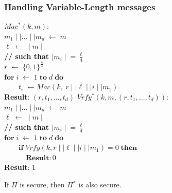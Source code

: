 \documentclass[../main]{subfiles}
\begin{document}
\subsubsection{Handling Variable-Length messages}
$Mac^{*}(k, m)$:\\
$m_1 \mid\mid{} \ldots{} \mid\mid{} m_d \; \leftarrow{} \; m$\\
$\ell{} \; \leftarrow{} \; \mid{} m \mid{}$\\
\textbf{// such that $\mid{} m_i \mid{} = \frac{\ell{}}{4}$}\\
$r \; \leftarrow{} \; \{0, 1\}^{\frac{n}{4}}$\\
$\textbf{for} \; i \; \leftarrow{} \; 1 \; \textbf{to} \; d \; \textbf{do}$\\
$\quad{}\quad{} t_i \; \leftarrow{} Mac(k, \; r\mid\mid{}\ell\mid\mid{}i\mid\mid{}m_1)$\\
\textbf{Result}: $(r, t_1, \ldots{},t_d)$
\newline
\newline
$Vrfy^{*}(k, m, (r, t_1, \ldots{}, t_d))$:\\
$m_1 \mid\mid{} \ldots{} \mid\mid{} m_d \; \leftarrow{} \; m$\\
$\ell{} \; \leftarrow{} \; \mid{} m \mid{}$\\
\textbf{// such that $\mid{} m_i \mid{} = \frac{\ell{}}{4}$}\\
$\textbf{for} \; i \; \leftarrow{} \; 1 \; \textbf{to} \; d \; \textbf{do}$\\
$\quad{}\quad{} \textbf{if} \; Vrfy(k, r\mid\mid{}\ell\mid\mid{}i\mid\mid{}m_1) = 0 \; \textbf{then}$\\
$\quad{}\quad{}\quad{} \textbf{Result}: 0$\\
\textbf{Result}: 1

\begin{theorem}
    If $\Pi{}$ is secure, then $\Pi{}^*$ is also secure.
\end{theorem}
\end{document}
